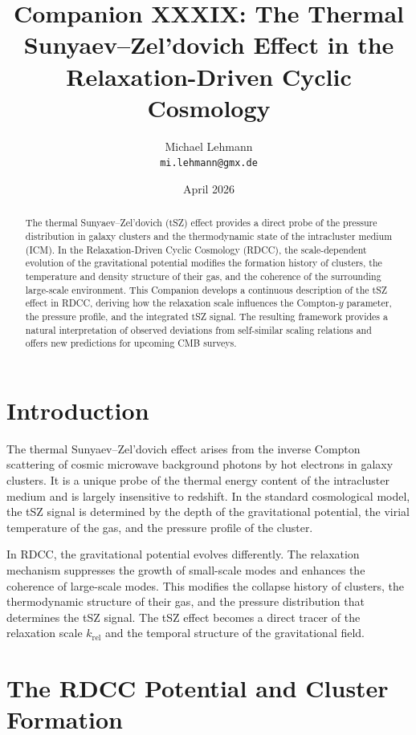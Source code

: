 \documentclass[11pt,a4paper]{article}
\title{\textbf{Companion XXXIX: The Thermal Sunyaev--Zel'dovich Effect in the Relaxation-Driven Cyclic Cosmology}}
\author{Michael Lehmann \\ \texttt{mi.lehmann@gmx.de}}
\date{April 2026}
\begin{document}
\maketitle

\begin{abstract}
The thermal Sunyaev--Zel'dovich (tSZ) effect provides a direct probe of the pressure 
distribution in galaxy clusters and the thermodynamic state of the intracluster 
medium (ICM). In the Relaxation-Driven Cyclic Cosmology (RDCC), the scale-dependent 
evolution of the gravitational potential modifies the formation history of clusters, 
the temperature and density structure of their gas, and the coherence of the 
surrounding large-scale environment. This Companion develops a continuous 
description of the tSZ effect in RDCC, deriving how the relaxation scale influences 
the Compton-$y$ parameter, the pressure profile, and the integrated tSZ signal. The 
resulting framework provides a natural interpretation of observed deviations from 
self-similar scaling relations and offers new predictions for upcoming CMB surveys.
\end{abstract}
\section{Introduction}

The thermal Sunyaev--Zel'dovich effect arises from the inverse Compton scattering 
of cosmic microwave background photons by hot electrons in galaxy clusters. It is 
a unique probe of the thermal energy content of the intracluster medium and is 
largely insensitive to redshift. In the standard cosmological model, the tSZ signal 
is determined by the depth of the gravitational potential, the virial temperature 
of the gas, and the pressure profile of the cluster.

In RDCC, the gravitational potential evolves differently. The relaxation mechanism 
suppresses the growth of small-scale modes and enhances the coherence of large-scale 
modes. This modifies the collapse history of clusters, the thermodynamic structure 
of their gas, and the pressure distribution that determines the tSZ signal. The 
tSZ effect becomes a direct tracer of the relaxation scale $k_{\mathrm{rel}}$ and 
the temporal structure of the gravitational field.
\section{The RDCC Potential and Cluster Formation}
\end{document}
